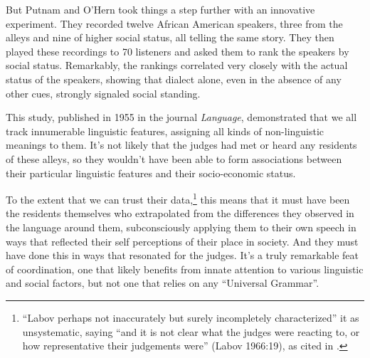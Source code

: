But Putnam and O'Hern took things a step further with an innovative experiment. They recorded twelve African American speakers, three from the alleys and nine of higher social status, all telling the same story. They then played these recordings to 70 listeners and asked them to rank the speakers by social status. Remarkably, the rankings correlated very closely with the actual status of the speakers, showing that dialect alone, even in the absence of any other cues, strongly signaled social standing.

This study, published in 1955 in the journal \textit{Language}, demonstrated that we all track innumerable linguistic features, assigning all kinds of non-linguistic meanings to them. It's not likely that the judges had met or heard any residents of these alleys, so they wouldn't have been able to form associations between their particular linguistic features and their socio-economic status.

To the extent that we can trust their data,\footnote{\enquote{Labov perhaps not inaccurately but surely incompletely characterized} it as unsystematic, saying \enquote{and it is not clear what the judges were reacting to, or how representative their judgements were} (Labov 1966:19), as cited in \citet[125]{Joseph2002}.} this means that it must have been the residents themselves who extrapolated from the differences they observed in the language around them, subconsciously applying them to their own speech in ways that reflected their self perceptions of their place in society. And they must have done this in ways that resonated for the judges. It's a truly remarkable feat of coordination, one that likely benefits from innate attention to various linguistic and social factors, but not one that relies on any \enquote{Universal Grammar}.

